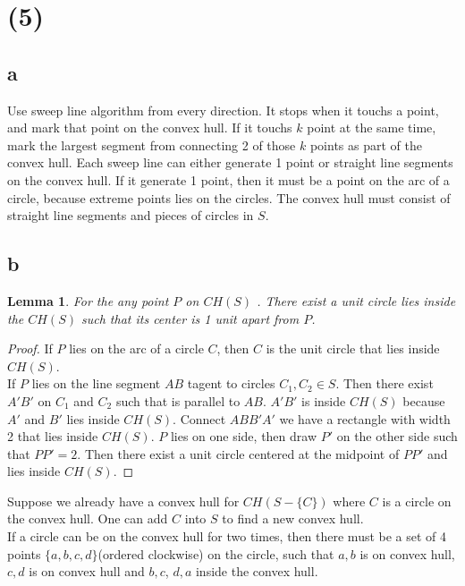 \documentclass[letter]{article}
\newtheorem{lemma}[theorem]{Lemma}
\begin{document}
\section*{(5)}
\subsection*{a}
Use sweep line algorithm from every direction. It stops when it touchs a point, and mark that point on the convex hull. If it touchs $k$ point at the same time, mark the largest segment from connecting 2 of those $k$ points as part of the convex hull. Each sweep line can either generate 1 point or straight line segments on the convex hull. If it generate 1 point, then it must be a point on the arc of a circle, because extreme points lies on the circles. The convex hull must consist of straight line segments and pieces of circles in $S$.

\subsection*{b}
\begin{lemma}
For the any point $P$ on $CH(S)$ . There exist a unit circle lies inside the $CH(S)$ such that its center is 1 unit apart from $P$.
\end{lemma}

\begin{proof}
If $P$ lies on the arc of a circle $C$, then $C$ is the unit circle that lies inside $CH(S)$.\\
If $P$ lies on the line segment $AB$ tagent to circles $C_1,C_2\in S$. Then there exist $A'B'$ on $C_1$ and $C_2$ such that is parallel to $AB$. $A'B'$ is inside $CH(S)$ because $A'$ and $B'$ lies inside $CH(S)$. Connect $ABB'A'$ we have a rectangle with width 2 that lies inside $CH(S)$. $P$ lies on one side, then draw $P'$ on the other side such that $PP' = 2$. Then there exist a unit circle centered at the midpoint of $PP'$ and lies inside $CH(S)$.
\end{proof}


Suppose we already have a convex hull for $CH(S-\{C\})$ where $C$ is a circle on the convex hull. One can add $C$ into $S$ to find a new convex hull.\\
If a circle can be on the convex hull for two times, then there must be a set of 4 points  $\{a,b,c,d\}$(ordered clockwise) on the circle, such that $a,b$ is on convex hull, $c,d$ is on convex hull and $b,c$, $d,a$ inside the convex hull.\\
\end{document}
